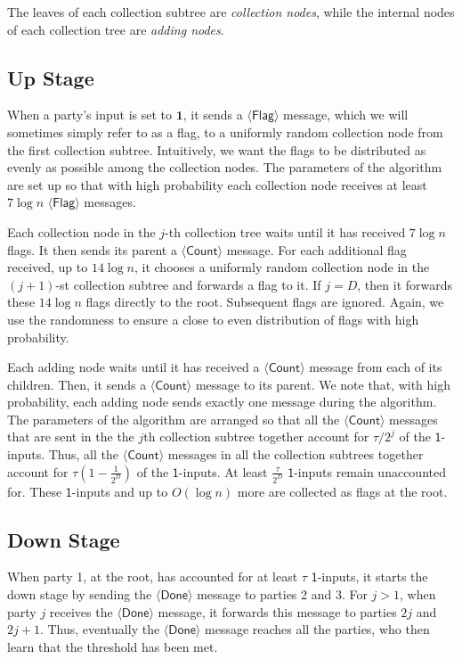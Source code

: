 \documentclass[11pt,letter]{article}
\theoremstyle{mytheoremstyle}
\newcommand{\dcl}{D}
\newcommand{\flag}{$\langle\mathsf{Flag}\rangle$\xspace}
\newcommand{\countm}{$\langle\mathsf{Count}\rangle$\xspace}
\newcommand{\done}{$\langle\mathsf{Done}\rangle$\xspace}
\newcommand{\oneinputs}{$\mathsf{1}$-inputs\xspace}
\begin{document}
The leaves of each collection subtree are \emph{collection nodes}, while the internal nodes of each collection tree are \emph{adding nodes}. 

\subsection{Up Stage}
When a party's input is set to $\mathbf{1}$, it sends a \flag message, which we will sometimes simply refer to as a flag, to a uniformly random collection node from the first collection subtree. Intuitively, we want the flags to be distributed as evenly as possible among the collection nodes. The parameters of the algorithm are set up so that with high probability each collection node receives at least $7\log{n}$ \flag messages.

Each collection node in the $j$-th collection tree waits until it has received $7\log{n}$ flags.
It then sends its parent a \countm message. For each additional flag received,  up to $14 \log n$, it chooses a uniformly random collection node in the $(j+1)$-st collection subtree and forwards a flag to it. If $j = \dcl$, then it forwards these $14\log{n}$ flags directly to the root.
Subsequent flags are ignored. Again, we use the randomness to ensure a close to even distribution of flags with high probability.

Each adding node waits until it has received a \countm message from each of its children. Then, it sends a \countm message to its parent. We note that, with high probability, each adding node sends exactly one message during the algorithm.
The parameters of the algorithm are arranged so that all the \countm messages that are sent in the the $j$th collection subtree together account for $\tau/2^j$ of the \oneinputs. Thus, all the \countm messages in all the collection subtrees together account for $\tau \left(1-\frac1{2^{\dcl}}\right)$ of the \oneinputs. At least $\frac{\tau}{2^{\dcl}}$ \oneinputs remain unaccounted for. These \oneinputs and up to $O(\log{n})$ more are collected as flags at the root.

\subsection{Down Stage}

When party 1, at the root,  has accounted for at least $\tau$
\oneinputs, it starts the down stage by sending the \done message to parties 2 and 3. For $j>1$, when party $j$ receives the \done message, it forwards this message to parties $2j$ and $2j +1$. Thus, eventually the
\done message reaches all the parties, who then learn that the threshold has been met.
\end{document}

